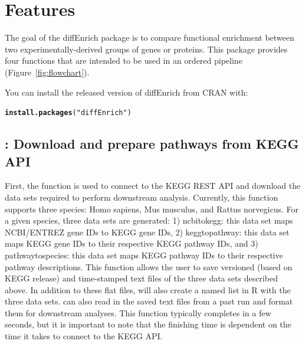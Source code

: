 \documentclass[article]{jss}\usepackage[]{graphicx}\usepackage[]{color}
\makeatletter
\newcommand{\hlstr}[1]{\textcolor[rgb]{0.192,0.494,0.8}{#1}}%
\newcommand{\hlstd}[1]{\textcolor[rgb]{0.345,0.345,0.345}{#1}}%
\newcommand{\hlkwd}[1]{\textcolor[rgb]{0.737,0.353,0.396}{\textbf{#1}}}%
\newenvironment{kframe}{%
 \def\at@end@of@kframe{}%
 \ifinner\ifhmode%
  \def\at@end@of@kframe{\end{minipage}}%
  \begin{minipage}{\columnwidth}%
 \fi\fi%
 \def\FrameCommand##1{\hskip\@totalleftmargin \hskip-\fboxsep
 \colorbox{shadecolor}{##1}\hskip-\fboxsep
     \hskip-\linewidth \hskip-\@totalleftmargin \hskip\columnwidth}%
 \MakeFramed {\advance\hsize-\width
   \@totalleftmargin\z@ \linewidth\hsize
   \@setminipage}}%
 {\par\unskip\endMakeFramed%
 \at@end@of@kframe}
\newenvironment{knitrout}{}{} %
\makeatother
\begin{document}

\section[Features]{Features} \label{sec:feat}

The goal of the diffEnrich package is to compare functional enrichment between
two experimentally-derived groups of genes or proteins. This package provides
four functions that are intended to be used in an ordered pipeline
(Figure~\ref{fig:flowchart}).

\medskip

You can install the released version of diffEnrich from CRAN with:

\begin{knitrout}
\color{fgcolor}\begin{kframe}
\begin{alltt}
\hlkwd{install.packages}\hlstd{(}\hlstr{"diffEnrich"}\hlstd{)}
\end{alltt}
\end{kframe}
\end{knitrout}

\subsection{: Download and prepare pathways from KEGG API}

First, the  function is used to connect to the
KEGG REST API and download the data sets required to perform downstream
analysis. Currently, this function supports three species: Homo sapiens, Mus
musculus, and Rattus norvegicus. For a given species, three data sets are
generated: 1) ncbi\textunderscore to\textunderscore kegg: this data set maps NCBI/ENTREZ gene IDs to KEGG gene
IDs, 2) kegg\textunderscore to\textunderscore pathway: this data set maps KEGG gene IDs to their respective
KEGG pathway IDs, and 3) pathway\textunderscore to\textunderscore species: this data set maps KEGG pathway IDs
to their respective pathway descriptions. This function allows the user to save
versioned (based on KEGG release) and time-stamped text files of the three data
sets described above. In addition to these flat files,  will also create
a named list in R with the three data sets.  can also read in the saved
text files from a past run and format them for downstream analyses. This
function typically completes in a few seconds, but it is important to note that
the finishing time is dependent on the time it takes to connect to the KEGG API.





\end{document}

